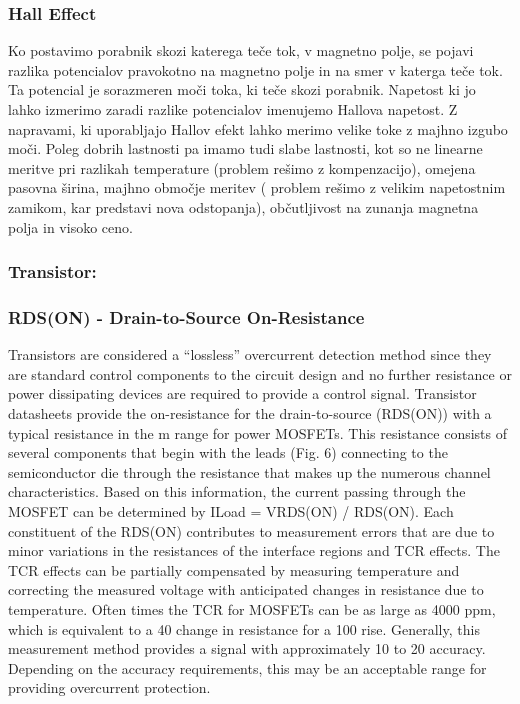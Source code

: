 \documentclass[12pt,a4paper,titlepage,openany]{report}
\begin{document}
\subsubsection{Hall Effect}
Ko postavimo porabnik skozi katerega teče tok, v magnetno polje, se pojavi razlika potencialov pravokotno na magnetno polje in na smer v katerga teče tok. Ta potencial je sorazmeren moči toka, ki teče skozi porabnik. Napetost ki jo lahko izmerimo zaradi razlike potencialov imenujemo Hallova napetost. Z napravami, ki uporabljajo Hallov efekt lahko merimo velike toke z majhno izgubo moči. Poleg dobrih lastnosti pa imamo tudi slabe lastnosti, kot so ne linearne meritve pri razlikah temperature (problem rešimo z kompenzacijo), omejena pasovna širina, majhno območje meritev ( problem rešimo z velikim napetostnim zamikom, kar predstavi nova odstopanja), občutljivost na zunanja magnetna polja in visoko ceno.

\subsubsection{Transistor:}
\subsubsection{RDS(ON) - Drain-to-Source On-Resistance}
Transistors are considered a “lossless” overcurrent detection method since they are standard control components to the circuit
design and no further resistance or power dissipating devices are required to provide a control signal. Transistor datasheets
provide the on-resistance for the drain-to-source (RDS(ON)) with a typical resistance in the m range for power MOSFETs. This
resistance consists of several components that begin with the leads (Fig. 6) connecting to the semiconductor die through the
resistance that makes up the numerous channel characteristics. Based on this information, the current passing through the
MOSFET can be determined by ILoad = VRDS(ON) / RDS(ON).
Each constituent of the RDS(ON) contributes to measurement errors that are due to minor variations in the resistances of the
interface regions and TCR effects. The TCR effects can be partially compensated by measuring temperature and correcting the
measured voltage with anticipated changes in resistance due to temperature. Often times the TCR for MOSFETs can be as large
as 4000 ppm, which is equivalent to a 40  change in resistance for a 100  rise. Generally, this measurement method
provides a signal with approximately 10  to 20  accuracy. Depending on the accuracy requirements, this may be an
acceptable range for providing overcurrent protection.
\end{document}
